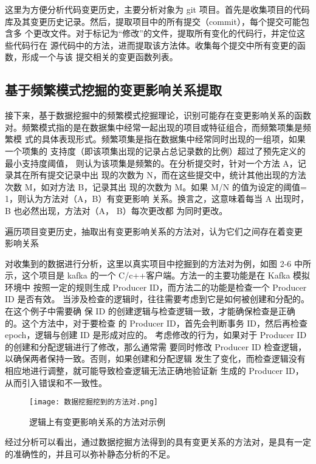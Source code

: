 这里为方便分析代码变更历史，主要分析对象为 git 项目。首先是收集项目的代码
库及其变更历史记录。然后，提取项目中的所有提交（commit），每个提交可能包含多
个更改文件。对于标记为“修改”的文件，提取所有变化的代码行，并定位这些代码行在
源代码中的方法，进而提取该方法体。收集每个提交中所有变更的函数，形成一个与该
提交相关的变更函数列表。

\subsection{基于频繁模式挖掘的变更影响关系提取}

接下来，基于数据挖掘中的频繁模式挖掘理论，识别可能存在变更影响关系的函数
对。频繁模式指的是在数据集中经常一起出现的项目或特征组合，而频繁项集是频繁模
式的具体表现形式。频繁项集是指在数据集中经常同时出现的一组项，如果一个项集的
支持度（即该项集出现的记录占总记录数的比例）超过了预先定义的最小支持度阈值，
则认为该项集是频繁的。在分析提交时，针对一个方法 A，记录其在所有提交记录中出
现的次数为 N，而在这些提交中，统计其他出现的方法次数 M，如对方法 B，记录其出
现的次数为 M。如果 M/N 的值为设定的阈值= 1，则认为方法对（A，B）有变更影响
关系。换言之，这意味着每当 A 出现时，B 也必然出现，方法对（A， B）每次更改都
为同时更改。

遍历项目变更历史，抽取出有变更影响关系的方法对，认为它们之间存在着变更
影响关系

对收集到的数据进行分析，这里以真实项目中挖掘到的方法对为例，如图 2-6 中所
示，这个项目是 kafka 的一个 C/c++客户端。方法一的主要功能是在 Kafka 模拟环境中
按照一定的规则生成 Producer ID，而方法二的功能是检查一个 Producer ID 是否有效。
当涉及检查的逻辑时，往往需要考虑到它是如何被创建和分配的。在这个例子中需要确
保 ID 的创建逻辑与检查逻辑一致，才能确保检查是正确的。这个方法中，对于要检查
的 Producer ID，首先会判断事务 ID，然后再检查 epoch，逻辑与创建 ID 是形成对应的。
考虑修改的行为，如果对于 Producer ID 的创建和分配逻辑进行了修改，那么通常需
要同时修改 Producer ID 检查逻辑，以确保两者保持一致。否则，如果创建和分配逻辑
发生了变化，而检查逻辑没有相应地进行调整，就可能导致检查逻辑无法正确地验证新
生成的 Producer ID，从而引入错误和不一致性。

\begin{figure}[h]
\centering
\texttt{[image: 数据挖掘挖到的方法对.png]}
\caption{逻辑上有变更影响关系的方法对示例}
\end{figure}


经过分析可以看出，通过数据挖掘方法得到的具有变更关系的方法对，是具有一定
的准确性的，并且可以弥补静态分析的不足。

